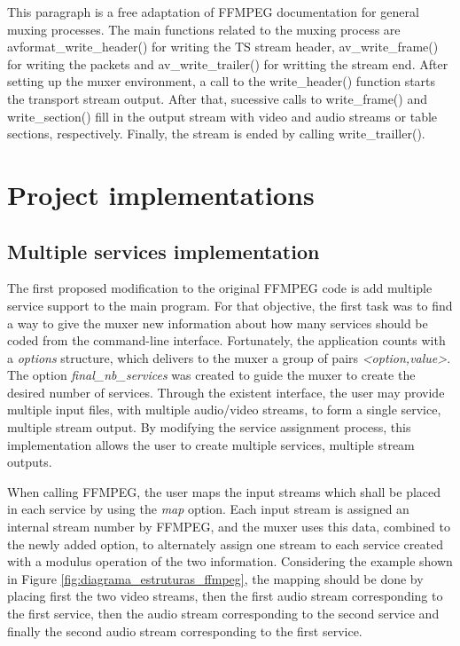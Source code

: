 \documentclass[
	12pt,				%
	openright,			%
	twoside,			%
	a4paper,			%
	brazil,
	french,				%
	english
	]{abntex2}
\begin{document}
This paragraph is a free adaptation of FFMPEG documentation for general muxing processes. The main functions related to the muxing process are avformat\_write\_header() for writing the TS stream header, av\_write\_frame() for writing the packets and av\_write\_trailer() for writting the stream end. After setting up the muxer environment, a call to the write\_header() function starts the transport stream output. After that, sucessive calls to write\_frame() and write\_section() fill in the output stream with video and audio streams or table sections, respectively. Finally, the stream is ended by calling write\_trailler().



\chapter{Project implementations}

\section{Multiple services implementation}

The first proposed modification to the original FFMPEG code is add multiple service support to the main program. For that objective, the first task was to find a way to give the muxer new information about how many services should be coded from the command-line interface. Fortunately, the application counts with a \textit{options} structure, which delivers to the muxer a group of pairs \textit{<option,value>}. The option \textit{final\_nb\_services} was created to guide the muxer to create the desired number of services. Through the existent interface, the user may provide multiple input files, with multiple audio/video streams, to form a single service, multiple stream output. By modifying the service assignment process, this implementation allows the user to create multiple services, multiple stream outputs.

When calling FFMPEG, the user maps the input streams which shall be placed in each service by using the \textit{\-map} option. Each input stream is assigned an internal stream number by FFMPEG, and the muxer uses this data, combined to the newly added option, to alternately assign one stream to each service created with a modulus operation of the two information. Considering the example shown in Figure \ref{fig:diagrama_estruturas_ffmpeg}, the mapping should be done by placing first the two video streams, then the first audio stream corresponding to the first service, then the audio stream corresponding to the second service and finally the second audio stream corresponding to the first service.
\end{document}
